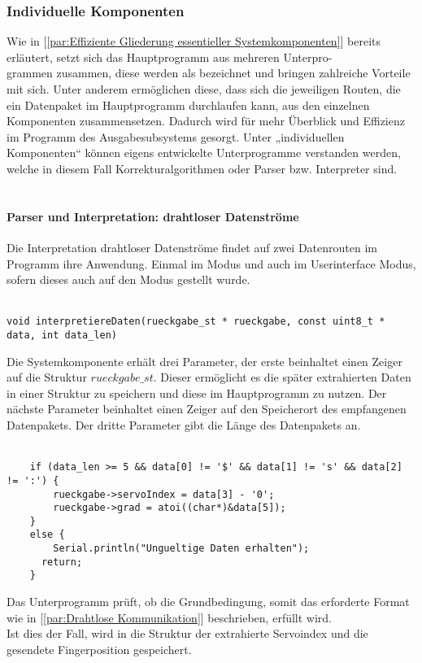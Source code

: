 \documentclass[titlepage,12pt,twoside]{article}
\begin{document}
\subsubsection{Individuelle Komponenten}
Wie in [\textcolor{blue}{\autoref{par:Effiziente Gliederung essentieller Systemkomponenten}}] bereits erläutert, setzt sich das Hauptprogramm aus mehreren 
Unterpro-\\grammen zusammen, diese werden als  bezeichnet und bringen zahlreiche Vorteile mit sich. Unter anderem ermöglichen diese, dass 
sich die jeweiligen Routen, die ein Datenpaket im Hauptprogramm durchlaufen kann, aus den einzelnen Komponenten zusammensetzen. Dadurch wird für mehr 
Überblick und Effizienz im Programm des Ausgabesubsystems gesorgt. Unter „individuellen Komponenten“ können eigens entwickelte Unterprogramme verstanden 
werden, welche in diesem Fall Korrekturalgorithmen oder Parser bzw. Interpreter sind. \\
\\

\paragraph{Parser und Interpretation: drahtloser Datenströme}
\label{par:Parser und Interpretation: drahtloser Datenströme}
\hfill \break
\hfill \break
Die Interpretation drahtloser Datenströme findet auf zwei Datenrouten im Programm ihre Anwendung. Einmal im  Modus und auch im Userinterface 
Modus, sofern dieses auch auf den  Modus gestellt wurde. \\
\\
\footnotesize
\begin{lstlisting}
void interpretiereDaten(rueckgabe_st * rueckgabe, const uint8_t * data, int data_len)
\end{lstlisting}
\hfill \break
\normalsize
Die Systemkomponente erhält drei Parameter, der erste beinhaltet einen Zeiger auf die Struktur $rueckgabe\_st$. Dieser ermöglicht es die später extrahierten 
Daten in einer Struktur zu speichern und diese im Hauptprogramm zu nutzen. Der nächste Parameter beinhaltet einen Zeiger auf den Speicherort des 
empfangenen Datenpakets. Der dritte Parameter gibt die Länge des Datenpakets an. \\
\\
\footnotesize
\begin{lstlisting}
	if (data_len >= 5 && data[0] != '$' && data[1] != 's' && data[2] != ':') {
		rueckgabe->servoIndex = data[3] - '0';
		rueckgabe->grad = atoi((char*)&data[5]);
	}
	else {
		Serial.println("Ungueltige Daten erhalten");
	  return;
	}
\end{lstlisting}
\hfill \break
\normalsize
Das Unterprogramm prüft, ob die Grundbedingung, somit das erforderte Format wie in [\textcolor{blue}{\autoref{par:Drahtlose Kommunikation}}] beschrieben, erfüllt wird. \\
Ist dies der Fall, wird in die Struktur  der extrahierte Servoindex und die gesendete Fingerposition gespeichert. \\
\\
\end{document}
